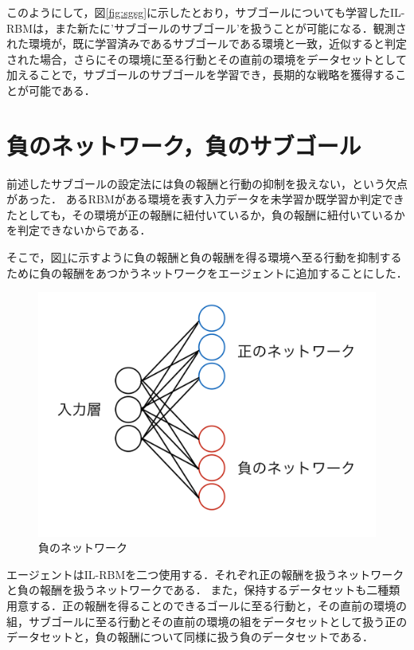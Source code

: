 このようにして，図\ref{fig:sgsg}に示したとおり，サブゴールについても学習したIL-RBMは，また新たに'サブゴールのサブゴール'を扱うことが可能になる．観測された環境が，既に学習済みであるサブゴールである環境と一致，近似すると判定された場合，さらにその環境に至る行動とその直前の環境をデータセットとして加えることで，サブゴールのサブゴールを学習でき，長期的な戦略を獲得することが可能である．

\section{負のネットワーク，負のサブゴール}
前述したサブゴールの設定法には負の報酬と行動の抑制を扱えない，という欠点があった．
あるRBMがある環境を表す入力データを未学習か既学習か判定できたとしても，その環境が正の報酬に紐付いているか，負の報酬に紐付いているかを判定できないからである．

そこで，図\ref{fig:hn}に示すように負の報酬と負の報酬を得る環境へ至る行動を抑制するために負の報酬をあつかうネットワークをエージェントに追加することにした．

\begin{figure}[tb]
 \begin{center}
  \includegraphics[scale=0.4]{./koki/hn.png}
  \caption{負のネットワーク}
  \label{fig:hn}
 \end{center}
\end{figure}

エージェントはIL-RBMを二つ使用する．それぞれ正の報酬を扱うネットワークと負の報酬を扱うネットワークである．
また，保持するデータセットも二種類用意する．正の報酬を得ることのできるゴールに至る行動と，その直前の環境の組，サブゴールに至る行動とその直前の環境の組をデータセットとして扱う正のデータセットと，負の報酬について同様に扱う負のデータセットである．

